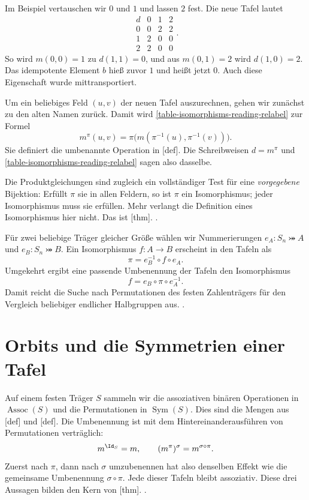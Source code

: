 Im Beispiel vertauschen wir \(0\) und \(1\) und lassen \(2\) fest.
Die neue Tafel lautet
\[
  \begin{array}{c|ccc}
    d&0&1&2\\\hline
    0&0&2&2\\
    1&2&0&0\\
    2&2&0&0
  \end{array}.
\]
So wird \(m(0,0)=1\) zu \(d(1,1)=0\), und aus
\(m(0,1)=2\) wird \(d(1,0)=2\). Das idempotente Element \(b\)
hieß zuvor \(1\) und heißt jetzt \(0\). Auch diese Eigenschaft
wurde mittransportiert.

Um ein beliebiges Feld \((u,v)\) der neuen Tafel auszurechnen,
gehen wir zunächst zu den alten Namen zurück. Damit wird
\eqref{table-isomorphisms-reading-relabel} zur Formel
\[
  m^\pi(u,v)
   =\pi\bigl(m(\pi^{-1}(u),\pi^{-1}(v))\bigr).
\]
Sie definiert die umbenannte Operation in
[def].
Die Schreibweisen \(d=m^\pi\) und
\eqref{table-isomorphisms-reading-relabel} sagen also dasselbe.

Die Produktgleichungen sind zugleich ein vollständiger Test für eine
\emph{vorgegebene} Bijektion: Erfüllt \(\pi\) sie in allen Feldern,
so ist \(\pi\) ein Isomorphismus; jeder Isomorphismus muss sie erfüllen.
Mehr verlangt die Definition eines Isomorphismus hier nicht.
Das ist
[thm].
.

Für zwei beliebige Träger gleicher Größe wählen wir Nummerierungen
\(e_A\colon S_n\bij A\) und \(e_B\colon S_n\bij B\). Ein
Isomorphismus \(f\colon A\to B\) erscheint in den Tafeln als
\[
  \pi=e_B^{-1}\circ f\circ e_A.
\]
Umgekehrt ergibt eine passende Umbenennung der Tafeln den Isomorphismus
\[
  f=e_B\circ\pi\circ e_A^{-1}.
\]
Damit reicht die Suche nach Permutationen des festen Zahlenträgers
für den Vergleich beliebiger endlicher Halbgruppen aus.
.

\section*{Orbits und die Symmetrien einer Tafel}

Auf einem festen Träger \(S\) sammeln wir die assoziativen binären
Operationen in \(\operatorname{Assoc}(S)\) und die Permutationen in
\(\operatorname{Sym}(S)\). Dies sind die Mengen aus
[def] und
[def]. Die Umbenennung
ist mit dem Hintereinanderausführen von Permutationen verträglich:
\[
  m^{\Id_S}=m,\qquad
  (m^\pi)^\sigma=m^{\sigma\circ\pi}.
\]
Zuerst nach \(\pi\), dann nach \(\sigma\) umzubenennen hat also
denselben Effekt wie die gemeinsame Umbenennung \(\sigma\circ\pi\).
Jede dieser Tafeln bleibt assoziativ. Diese drei Aussagen bilden den
Kern von
[thm].
.

